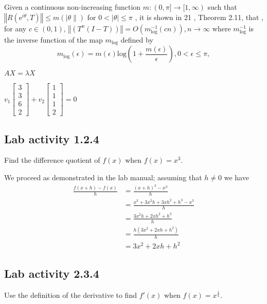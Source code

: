 \documentclass{article}
\begin{document}
Given a continuous non-increasing function 
$m : (0,\pi] \to [1,\infty )$ 
such that $\left\Vert R(\mathrm{e}^{i\theta}, T) \right\Vert \leq m(|\theta\|)$ 
for $0 < |\theta| \leq \pi$  , 
it is shown in 21 , Theorem 2.11, that , 
for any $c \in (0,1)$, 
$\left\Vert (T^n (I-T)) \right\Vert = O(m_\mathrm{log}^{-1}(cn)), n \to \infty $
where $m_\mathrm{log}^{-1}$ is the inverse function of the map $m_{\mathrm{log}}$ defined by 
\begin{equation}
  m_{\mathrm{log}}(\epsilon) = m(\epsilon) \mathrm{log} \left(1+ \frac{m(\epsilon)}{\epsilon} \right) , 0<\epsilon \leq \pi , 
\end{equation}






$AX=\lambda X$

$v_1 \begin{bmatrix}
  3\\3\\6\\2
\end{bmatrix}
+
v_2 \begin{bmatrix}
  1\\1\\1\\2
\end{bmatrix}
= 0
$







\subsection*{Lab activity 1.2.4}
Find the difference quotient of $f(x)$ when $f(x)=x^3$.

We proceed as demonstrated in the lab manual; assuming that $h\ne 0$ 
we have
\begin{align*}
    \frac{f(x+h)-f(x)}{h} & =  \frac{(x+h)^3-x^3}{h}   \\
                          & =  \frac{x^3+3x^2h+3xh^2+h^3 - x^3}{h}\\
                          & =  \frac{3x^2h+2xh^2+h^3}{h}\\
                          & =  \frac{h(3x^2+2xh+h^2)}{h}\\
                          & =  3x^2+2xh+h^2
\end{align*} 

\subsection*{Lab activity 2.3.4}
Use the definition of the derivative to find $f'(x)$ when $f(x)=x^{\frac{1}{4}}$.
\end{document}
